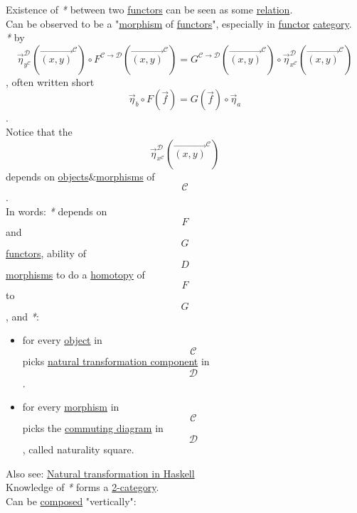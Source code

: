 \documentclass[11pt]{article}
\begin{document}
Existence of \emph{*} between two \hyperref[orgdd21ed6]{functors} can be seen as some \hyperref[orga5705a9]{relation}.\\

Can be observed to be a "\hyperref[org5de09d4]{morphism} of \hyperref[orgdd21ed6]{functors}", especially in \hyperref[orgf2f6841]{functor} \hyperref[org0450535]{category}.\\
\emph{*} by $$ \overrightarrow{\eta}^{\mathcal{D}}_{y^{\mathcal{C}}}(\overrightarrow{(x,y)}^{\mathcal{C}}) \circ F^{\mathcal{C \to D}}(\overrightarrow{(x,y)}^{\mathcal{C}}) = G^{\mathcal{C \to D}}(\overrightarrow{(x,y)}^{\mathcal{C}}) \circ \overrightarrow{\eta}^{\mathcal{D}}_{x^{\mathcal{C}}}(\overrightarrow{(x,y)}^{\mathcal{C}}) $$, often written short $$ \overrightarrow{\eta}_{b} \circ F(\overrightarrow{f}) = G(\overrightarrow{f}) \circ \overrightarrow{\eta}_{a} $$.\\
Notice that the $$ \overrightarrow{\eta}^{\mathcal{D}}_{x^{\mathcal{C}}}(\overrightarrow{(x,y)}^{\mathcal{C}}) $$ depends on \hyperref[org363acc2]{objects}\&\hyperref[org6c2fa5c]{morphisms} of $$ \mathcal{C} $$.\\

In words: \emph{*} depends on $$ F $$ and $$ G $$ \hyperref[orgdd21ed6]{functors}, ability of $$ D $$ \hyperref[org6c2fa5c]{morphisms} to do a \hyperref[orgb19d3ed]{homotopy} of $$ F $$ to $$ G $$, and \emph{*}:\\
\begin{itemize}
\item for every \hyperref[org4be0e9d]{object} in $$ \mathcal{C} $$ picks \hyperref[org716c3c1]{natural transformation component} in $$ \mathcal{D} $$.\\
\item for every \hyperref[org5de09d4]{morphism} in $$ \mathcal{C} $$ picks the \hyperref[orged0a20d]{commuting diagram} in $$ \mathcal{D} $$, called \label{org67fab7e}naturality square.\\
\end{itemize}

Also see: \hyperref[orgbae1394]{Natural transformation in Haskell}\\

Knowledge of \emph{*} forms a \hyperref[org44691ab]{2-category}.\\

Can be \hyperref[orgc78ac5d]{composed} "vertically":\\

\end{document}
